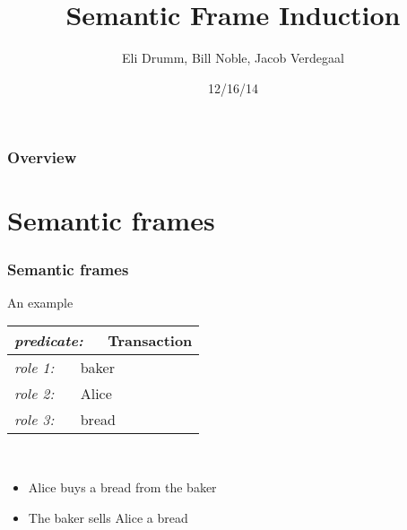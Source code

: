 \documentclass{beamer}
\title[Semantic Frame Induction]{Semantic Frame Induction} %
\author{Eli Drumm, Bill Noble, Jacob Verdegaal} %
\institute[UvA] %
{
University of Amsterdam \\ %
\medskip

}
\date{12/16/14}
\begin{document}
\begin{frame}
\titlepage 
\end{frame}

\begin{frame}
\frametitle{Overview} 
\tableofcontents 
\end{frame}


\section{Semantic frames}


\begin{frame}
  \frametitle{Semantic frames}
  An example\\
  \vspace{10pt}
\begin{tabular}{|l|}
  \hline
  \textit{\small predicate:\normalsize}~~~Transaction\\
  \hline
  \hline
  \textit{\small role 1:\normalsize}~~~ baker\\
  \textit{\small role 2:\normalsize}~~~ Alice\\
  \textit{\small role 3:\normalsize}~~~ bread\\
  \hline
\end{tabular}\\
\vfill
\begin{itemize}
\item Alice buys a bread from the baker
\item The baker sells Alice a bread
  \end{itemize}
\end{frame}
\end{document}
